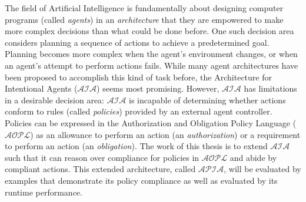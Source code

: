 The field of Artificial Intelligence is fundamentally about designing computer programs (called \textit{agents}) in an \textit{architecture} that they are empowered to make more complex decisions than what could be done before.
One such decision area considers planning a sequence of actions to achieve a predetermined goal.
Planning becomes more complex when the agent's environment changes, or when an agent's attempt to perform actions fails.
While many agent architectures have been proposed to accomplish this kind of task before, the Architecture for Intentional Agents ($\mathcal{AIA}$) seems most promising.
However, $\mathcal{AIA}$ has limitations in a desirable decision area: $\mathcal{AIA}$ is incapable of determining whether actions conform to rules (called \textit{policies}) provided by an external agent controller.
Policies can be expressed in the Authorization and Obligation Policy Language ($\mathcal{AOPL}$) as an allowance to perform an action (an \textit{authorization}) or a requirement to perform an action (an \textit{obligation}).
The work of this thesis is to extend $\mathcal{AIA}$ such that it can reason over compliance for policies in $\mathcal{AOPL}$ and abide by compliant actions.
This extended architecture, called $\mathcal{APIA}$, will be evaluated by examples that demonstrate its policy compliance as well as evaluated by its runtime performance.
